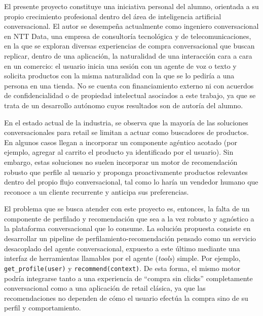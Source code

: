 \documentclass[
11pt, %
]{charter}
\begin{document}
El presente proyecto constituye una iniciativa personal del alumno, orientada a su propio crecimiento profesional dentro del área de inteligencia artificial conversacional. El autor se desempeña actualmente como ingeniero conversacional en NTT Data, una empresa de consultoría tecnológica y de telecomunicaciones, en la que se exploran diversas experiencias de compra conversacional que buscan replicar, dentro de una aplicación, la naturalidad de una interacción cara a cara en un comercio: el usuario inicia una sesión con un agente de voz o texto y solicita productos con la misma naturalidad con la que se lo pediría a una persona en una tienda. No se cuenta con financiamiento externo ni con acuerdos de confidencialidad o de propiedad intelectual asociados a este trabajo, ya que se trata de un desarrollo autónomo cuyos resultados son de autoría del alumno.

En el estado actual de la industria, se observa que la mayoría de las soluciones conversacionales para retail se limitan a actuar como buscadores de productos. En algunos casos llegan a incorporar un componente agéntico acotado (por ejemplo, agregar al carrito el producto ya identificado por el usuario). Sin embargo, estas soluciones no suelen incorporar un motor de recomendación robusto que perfile al usuario y proponga proactivamente productos relevantes dentro del propio flujo conversacional, tal como lo haría un vendedor humano que reconoce a un cliente recurrente y anticipa sus preferencias.

El problema que se busca atender con este proyecto es, entonces, la falta de un componente de perfilado y recomendación que sea a la vez robusto y agnóstico a la plataforma conversacional que lo consume. La solución propuesta consiste en desarrollar un pipeline de perfilamiento-recomendación pensado como un servicio desacoplado del agente conversacional, expuesto a este último mediante una interfaz de herramientas llamables por el agente (\textit{tools}) simple. Por ejemplo, \texttt{get\_profile(user)} y \texttt{recommend(context)}. De esta forma, el mismo motor podría integrarse tanto a una experiencia de ``compra sin clicks'' completamente conversacional como a una aplicación de retail clásica, ya que las recomendaciones no dependen de cómo el usuario efectúa la compra sino de su perfil y comportamiento.
\end{document}
